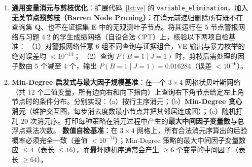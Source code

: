 
\begin{enumerate}[label=\textbf{4.\arabic*}, resume]
  \item \textbf{通用变量消元与剪枝优化}：扩展代码~\ref{lst:ve} 的 \texttt{variable\_elimination}，加入\textbf{无关节点预剪枝（Barren Node Pruning）}：在消元前递归删除所有既不在查询集 $\mathbf{Q}$、也不在证据集 $\mathbf{E}$ 中的无观测叶子节点。将其运行在 5 节点警报网络与习题 4.2 的学生成绩网络（自设合法 CPT）上，核验以下两项自检基准：
  （1）对警报网络任意 6 组不同查询与证据组合，VE 输出与暴力枚举的绝对误差均 $< 10^{-14}$；
  （2）查询 $P(B=1\mid J=1)$ 时，剪枝后需处理的因子数由 $5$ 个减至 $4$ 个，输出 $P(B=1\mid J=1) = 0.016284$（误差 $< 10^{-6}$）。

  \item \textbf{Min-Degree 启发式与最大因子规模基准}：在一个 $3 \times 4$ 网格状贝叶斯网络（共 12 个二值变量，所有边向右和向下指向）上查询右下角节点给定左上角节点时的条件分布。分别实现：（a）按行主序消元；（b）\textbf{Min-Degree 贪心消元}（维护交互图，每步消去度数最小节点并把其邻居连成团）；（c）随机打乱 20 次消元序。打印每种策略在消元过程中产生的\textbf{最大中间因子变量数}与总浮点乘法次数。
  \textbf{数值自检基准}：在 $3\times 4$ 网格上，所有合法消元序算出的后验概率必须完全一致（差值 $< 10^{-14}$）；Min-Degree 策略的最大中间因子变量数应 $\le 4$（表长 $\le 16$），而最坏随机序通常会产生 $\ge 6$ 个变量的中间因子（表长 $\ge 64$）。
\end{enumerate}
